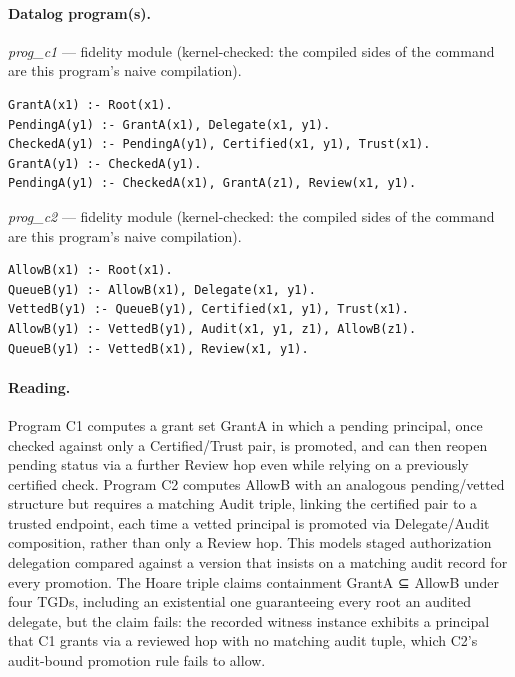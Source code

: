 \documentclass[10pt]{article}
\begin{document}
\paragraph{Datalog program(s).}

{\raggedright\textit{prog\_c1} --- fidelity module (kernel-checked: the compiled sides of the command are this program's naive compilation).\par}

\begin{Verbatim}[fontsize=\scriptsize,breaklines=true,breakanywhere=true,frame=single,framesep=1.5mm]
GrantA(x1) :- Root(x1).
PendingA(y1) :- GrantA(x1), Delegate(x1, y1).
CheckedA(y1) :- PendingA(y1), Certified(x1, y1), Trust(x1).
GrantA(y1) :- CheckedA(y1).
PendingA(y1) :- CheckedA(x1), GrantA(z1), Review(x1, y1).
\end{Verbatim}

{\raggedright\textit{prog\_c2} --- fidelity module (kernel-checked: the compiled sides of the command are this program's naive compilation).\par}

\begin{Verbatim}[fontsize=\scriptsize,breaklines=true,breakanywhere=true,frame=single,framesep=1.5mm]
AllowB(x1) :- Root(x1).
QueueB(y1) :- AllowB(x1), Delegate(x1, y1).
VettedB(y1) :- QueueB(y1), Certified(x1, y1), Trust(x1).
AllowB(y1) :- VettedB(y1), Audit(x1, y1, z1), AllowB(z1).
QueueB(y1) :- VettedB(x1), Review(x1, y1).
\end{Verbatim}

\paragraph{Reading.} Program C1 computes a grant set GrantA in which a pending principal, once checked against only a Certified/Trust pair, is promoted, and can then reopen pending status via a further Review hop even while relying on a previously certified check. Program C2 computes AllowB with an analogous pending/vetted structure but requires a matching Audit triple, linking the certified pair to a trusted endpoint, each time a vetted principal is promoted via Delegate/Audit composition, rather than only a Review hop. This models staged authorization delegation compared against a version that insists on a matching audit record for every promotion. The Hoare triple claims containment GrantA ⊆ AllowB under four TGDs, including an existential one guaranteeing every root an audited delegate, but the claim fails: the recorded witness instance exhibits a principal that C1 grants via a reviewed hop with no matching audit tuple, which C2's audit-bound promotion rule fails to allow.
\end{document}
